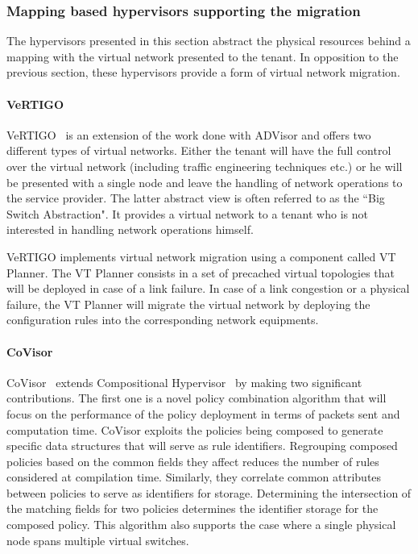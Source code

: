 \subsubsection{Mapping based hypervisors supporting the migration}
The hypervisors presented in this section abstract the physical resources behind a mapping with the virtual network presented to the tenant. In opposition to the previous section, these hypervisors provide a form of virtual network migration. 

\paragraph{VeRTIGO}
VeRTIGO~\cite{VeRTIGO-Corin2012a} is an extension of the work done with ADVisor and offers two different types of virtual networks.
Either the tenant will have the full control over the virtual network (including traffic engineering techniques etc.) or he will be presented with a single node and leave the handling of network operations to the service provider.
The latter abstract view is often referred to as the ``Big Switch Abstraction".
It provides a virtual network to a tenant who is not interested in handling network operations himself.

VeRTIGO implements virtual network migration using a component called VT Planner. The VT Planner consists in a set of precached virtual topologies that will be deployed in case of a link failure. In case of a link congestion or a physical failure, the VT Planner will migrate the virtual network by deploying the configuration rules into the corresponding network equipments.

\paragraph{CoVisor}
CoVisor~\cite{CoVisor-Jin2015} extends Compositional Hypervisor~\cite{CompositionalHypervisor-Jin2014} by making two significant contributions.
The first one is a novel policy combination algorithm that will focus on the performance of the policy deployment in terms of packets sent and computation time.
CoVisor exploits the policies being composed to generate specific data structures that will serve as rule identifiers.
Regrouping composed policies based on the common fields they affect reduces the number of rules  considered at compilation time.
Similarly, they correlate common attributes between policies to serve as identifiers for storage. Determining the intersection of the matching fields for two policies determines the identifier storage for the composed policy.
This algorithm also supports the case where a single physical node spans multiple virtual switches.

